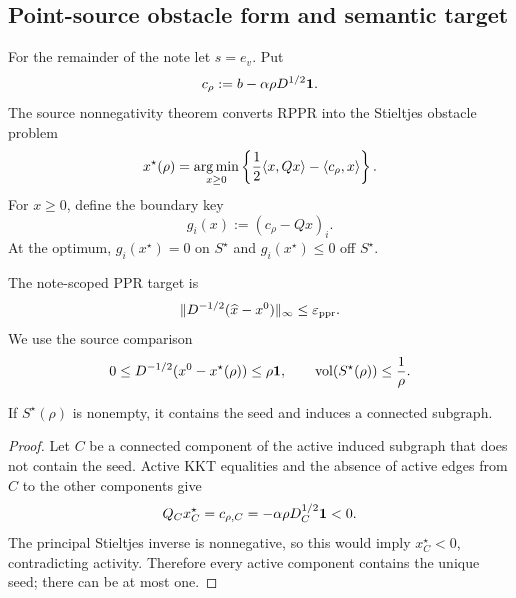 \subsection{Point-source obstacle form and semantic target}
\label{subsec:two-stage-obstacle}

For the remainder of the note let $s=e_v$.  Put
\begin{equation}
 c_\rho:=b-\alpha\rho D^{1/2}\mathbf{1}.
 \label{eq:two-stage-load}
\end{equation}
The source nonnegativity theorem converts RPPR into the Stieltjes obstacle
problem
\begin{equation}
 x^\star(\rho)
 =\operatorname*{arg\,min}_{x\geq0}
 \left\{\frac12\langle x,Qx\rangle-\langle c_\rho,x\rangle\right\}.
 \label{eq:two-stage-obstacle}
\end{equation}
For $x\geq0$, define the boundary key
\begin{equation}
 g_i(x):=(c_\rho-Qx)_i.
 \label{eq:two-stage-key}
\end{equation}
At the optimum, $g_i(x^\star)=0$ on $S^\star$ and
$g_i(x^\star)\leq0$ off $S^\star$.

The note-scoped PPR target is
\begin{equation}
 \lVert D^{-1/2}(\widehat x-x^0)\rVert_\infty\leq\varepsilon_{\mathrm{ppr}}.
 \label{eq:two-stage-ppr-target}
\end{equation}
We use the source comparison
\begin{equation}
 0\leq D^{-1/2}(x^0-x^\star(\rho))\leq\rho\mathbf{1},
 \qquad
 \operatorname{vol}(S^\star(\rho))\leq\frac1\rho.
 \label{eq:two-stage-rppr-bridge}
\end{equation}

\begin{lemma}
\label{lem:two-stage-point-source-connected}
If $S^\star(\rho)$ is nonempty, it contains the seed and induces a connected
subgraph.
\end{lemma}

\begin{proof}
Let $C$ be a connected component of the active induced subgraph that does not
contain the seed.  Active KKT equalities and the absence of active edges from
$C$ to the other components give
\begin{equation*}
 Q_Cx_C^\star=c_{\rho,C}
 =-\alpha\rho D_C^{1/2}\mathbf{1}<0.
\end{equation*}
The principal Stieltjes inverse is nonnegative, so this would imply
$x_C^\star<0$, contradicting activity.  Therefore every active component
contains the unique seed; there can be at most one.
\end{proof}

